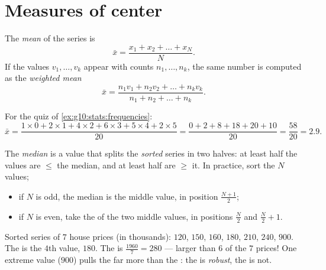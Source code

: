 \section{Measures of center}

\begin{definition}[Mean]\label{def:g10:stats:mean}
The \emph{mean} of the series is
\[
\bar x = \frac{x_1 + x_2 + \dots + x_N}{N}.
\]
If the values $v_1, \dots, v_k$ appear with counts $n_1, \dots, n_k$, the
same number is computed as the \emph{weighted mean}
\[
\bar x = \frac{n_1 v_1 + n_2 v_2 + \dots + n_k v_k}{n_1 + n_2 + \dots + n_k}.
\]
\end{definition}

\begin{example}\label{ex:g10:stats:mean}
For the quiz of \cref{ex:g10:stats:frequencies}:
\[
\bar x = \frac{1 \times 0 + 2 \times 1 + 4 \times 2 + 6 \times 3
+ 5 \times 4 + 2 \times 5}{20}
= \frac{0 + 2 + 8 + 18 + 20 + 10}{20}
= \frac{58}{20} = 2.9 .
\]
\end{example}

\begin{definition}[Median]\label{def:g10:stats:median}
The \emph{median} is a value that splits the \emph{sorted}
series in two halves: at least half the values are $\leq$ the median, and
at least half are $\geq$ it. In practice, sort the $N$ values;
\begin{itemize}
  \item if $N$ is odd, the median is the middle value, in position
        $\frac{N+1}{2}$;
  \item if $N$ is even, take the  of the two middle values, in
        positions $\frac N2$ and $\frac N2 + 1$.
\end{itemize}
\end{definition}

\begin{example}\label{ex:g10:stats:median}
Sorted series of $7$ house prices (in thousands): $120$, $150$, $160$,
$180$, $210$, $240$, $900$. The  is the $4$th value, $180$. The 
is $\frac{1960}{7} = 280$ --- larger than $6$ of the $7$ prices!
One extreme value ($900$) pulls the  far more than the : the
 is \emph{robust}, the  is not.
\end{example}

